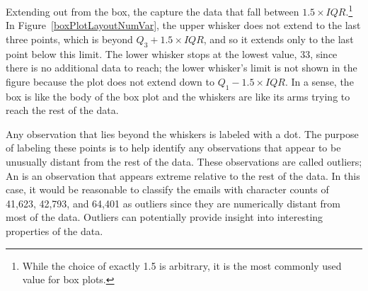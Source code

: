 \begin{doublespace}

Extending out from the box, the  capture the data that fall between $1.5\times IQR$.\footnote{While the choice of exactly 1.5 is arbitrary, it is the most commonly used value for box plots.} In Figure~\ref{boxPlotLayoutNumVar}, the upper whisker does not extend to the last three points, which is beyond $Q_3 + 1.5\times IQR$, and so it extends only to the last point below this limit. The lower whisker stops at the lowest value, 33, since there is no additional data to reach; the lower whisker's limit is not shown in the figure because the plot does not extend down to $Q_1 - 1.5\times IQR$. In a sense, the box is like the body of the box plot and the whiskers are like its arms trying to reach the rest of the data.

Any observation that lies beyond the whiskers is labeled with a dot. The purpose of labeling these points is to help identify any observations that appear to be unusually distant from the rest of the data. These observations are called outliers; An  is an observation that appears extreme relative to the rest of the data. In this case, it would be reasonable to classify the emails with character counts of 41,623, 42,793, and 64,401 as outliers since they are numerically distant from most of the data. Outliers can potentially provide insight into interesting properties of the data. 


\end{doublespace}
